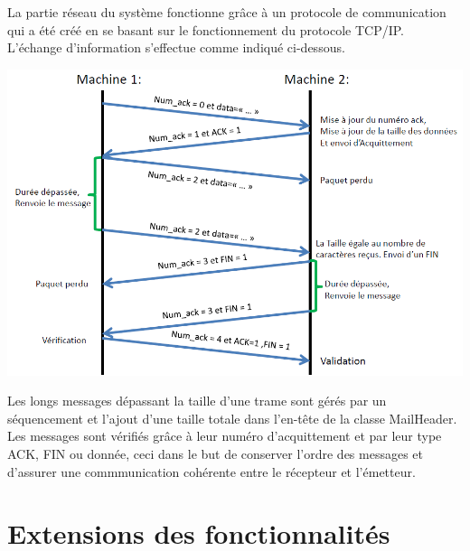 \documentclass[12pt]{report}
\begin{document}
La partie réseau du système fonctionne grâce à un protocole de communication qui a été créé en se basant sur le fonctionnement du protocole TCP/IP. L'échange d'information s'effectue comme indiqué ci-dessous.

\begin{center}
\includegraphics[scale=0.6]{protocoleReseau}
\end{center}

\bigskip


Les longs messages dépassant la taille d’une trame sont gérés par
un séquencement et l’ajout d'une taille totale dans l’en-tête de la classe MailHeader. \\


Les messages sont vérifiés grâce à leur numéro d'acquittement et par leur type ACK, FIN ou donnée, ceci dans le but de conserver l'ordre des messages et d'assurer une commmunication cohérente entre le récepteur et l'émetteur.
\newpage

\section{Extensions des fonctionnalités}
\end{document}
